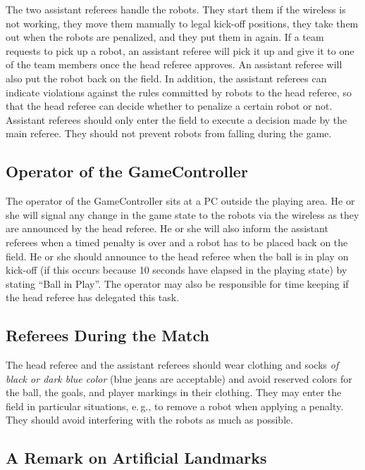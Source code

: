 \documentclass[12pt]{article}
\newcommand{\eg}{\mbox{e.\,g.}\xspace}
\begin{document}
The two assistant referees handle the robots. They start them if the wireless is not working, they move them manually to legal kick-off positions, they take them out when the robots are penalized, and they put them in again. If a team requests to pick up a robot, an assistant referee will pick it up and give it to one of the team members once the head referee approves. An assistant referee will also put the robot back on the field. In addition, the assistant referees can indicate violations against the rules committed by robots to the head referee, so that the head referee can decide whether to penalize a certain robot or not. Assistant referees should only enter the field to execute a decision made by the main referee. They should not prevent robots from falling during the game.

\subsection{Operator of the GameController}
\label{sec:gameControllerOp}
The operator of the GameController sits at a PC outside the playing area. He or she will signal any change in the game state to the robots via the wireless as they are announced by the head referee. He or she will also inform the assistant referees when a timed penalty is over and a robot has to be placed back on the field. He or she should announce to the head referee when the ball is in play on kick-off (if this occurs because 10 seconds have elapsed in the playing state) by stating ``Ball in Play''. The operator may also be responsible for time keeping if the head referee has delegated this task.

\subsection{Referees During the Match}

The head referee and the assistant referees should wear clothing and socks \emph{of black or dark blue color} (blue jeans are acceptable) and avoid reserved colors for the ball, the goals, and player markings in their clothing. They may enter the field in particular situations, \eg, to remove a robot when applying a penalty. They should avoid interfering with the robots as much as possible.

\subsection{A Remark on Artificial Landmarks}
\label{sec:judgement:landmarks}
\end{document}
